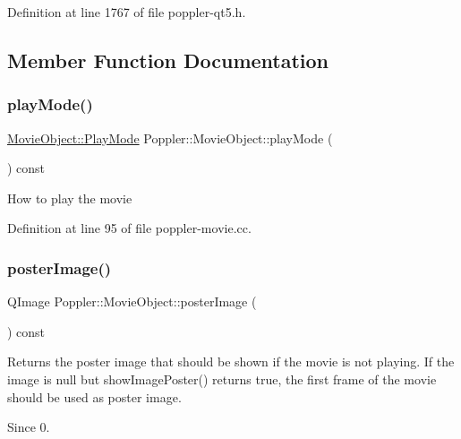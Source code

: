 Definition at line 1767 of file poppler-\/qt5.\+h.



\subsection{Member Function Documentation}
\mbox{\label{class_poppler_1_1_movie_object_ae460ca6d4cd34b7602af498a74d15235}} 
\subsubsection{\texorpdfstring{play\+Mode()}{playMode()}}
{\footnotesize\ttfamily \hyperlink{class_poppler_1_1_movie_object_adeb798fc202760b8fa27d7a8a5a0e9b3}{Movie\+Object\+::\+Play\+Mode} Poppler\+::\+Movie\+Object\+::play\+Mode (\begin{DoxyParamCaption}{ }\end{DoxyParamCaption}) const}

How to play the movie 

Definition at line 95 of file poppler-\/movie.\+cc.

\mbox{\label{class_poppler_1_1_movie_object_ab87b29b062869558463a48cff4f7a21e}} 
\subsubsection{\texorpdfstring{poster\+Image()}{posterImage()}}
{\footnotesize\ttfamily Q\+Image Poppler\+::\+Movie\+Object\+::poster\+Image (\begin{DoxyParamCaption}{ }\end{DoxyParamCaption}) const}

Returns the poster image that should be shown if the movie is not playing. If the image is null but show\+Image\+Poster() returns {\ttfamily true}, the first frame of the movie should be used as poster image. \begin{DoxySince}{Since}
0. 
\end{DoxySince}



